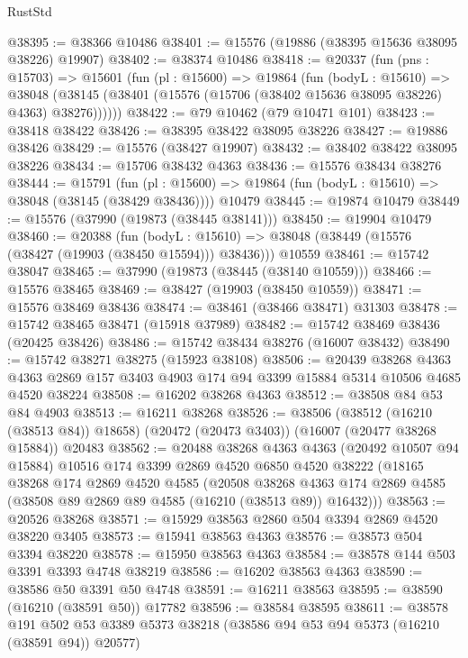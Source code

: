 \begin{lexlean}{RustStd}
\begin{coremodule}
@38395 := @38366 @10486
@38401 := @15576 (@19886 (@38395 @15636 @38095 @38226) @19907)
@38402 := @38374 @10486
@38418 := @20337
    (fun (pns : @15703) =>
    @15601
      (fun (pl : @15600) =>
      @19864
        (fun (bodyL : @15610) =>
        @38048 (@38145 (@38401 (@15576 (@15706 (@38402 @15636 @38095 @38226) @4363) @38276))))))
@38422 := @79 @10462 (@79 @10471 @101)
@38423 := @38418 @38422
@38426 := @38395 @38422 @38095 @38226
@38427 := @19886 @38426
@38429 := @15576 (@38427 @19907)
@38432 := @38402 @38422 @38095 @38226
@38434 := @15706 @38432 @4363
@38436 := @15576 @38434 @38276
@38444 := @15791
    (fun (pl : @15600) => @19864 (fun (bodyL : @15610) => @38048 (@38145 (@38429 @38436))))
    @10479
@38445 := @19874 @10479
@38449 := @15576 (@37990 (@19873 (@38445 @38141)))
@38450 := @19904 @10479
@38460 := @20388
    (fun (bodyL : @15610) => @38048 (@38449 (@15576 (@38427 (@19903 (@38450 @15594))) @38436)))
    @10559
@38461 := @15742 @38047
@38465 := @37990 (@19873 (@38445 (@38140 @10559)))
@38466 := @15576 @38465
@38469 := @38427 (@19903 (@38450 @10559))
@38471 := @15576 @38469 @38436
@38474 := @38461 (@38466 @38471) @31303
@38478 := @15742 @38465 @38471 (@15918 @37989)
@38482 := @15742 @38469 @38436 (@20425 @38426)
@38486 := @15742 @38434 @38276 (@16007 @38432)
@38490 := @15742 @38271 @38275 (@15923 @38108)
@38506 := @20439
    @38268
    @4363
    @4363
    @2869
    @157
    @3403
    @4903
    @174
    @94
    @3399
    @15884
    @5314
    @10506
    @4685
    @4520
    @38224
@38508 := @16202 @38268 @4363
@38512 := @38508 @84 @53 @84 @4903
@38513 := @16211 @38268
@38526 := @38506
    (@38512 (@16210 (@38513 @84)) @18658)
    (@20472 (@20473 @3403))
    (@16007 (@20477 @38268 @15884))
    @20483
@38562 := @20488
    @38268
    @4363
    @4363
    (@20492 @10507 @94 @15884)
    @10516
    @174
    @3399
    @2869
    @4520
    @6850
    @4520
    @38222
    (@18165
      @38268
      @174
      @2869
      @4520
      @4585
      (@20508
        @38268
        @4363
        @174
        @2869
        @4585
        (@38508 @89 @2869 @89 @4585 (@16210 (@38513 @89)) @16432)))
@38563 := @20526 @38268
@38571 := @15929 @38563 @2860 @504 @3394 @2869 @4520 @38220 @3405
@38573 := @15941 @38563 @4363
@38576 := @38573 @504 @3394 @38220
@38578 := @15950 @38563 @4363
@38584 := @38578 @144 @503 @3391 @3393 @4748 @38219
@38586 := @16202 @38563 @4363
@38590 := @38586 @50 @3391 @50 @4748
@38591 := @16211 @38563
@38595 := @38590 (@16210 (@38591 @50)) @17782
@38596 := @38584 @38595
@38611 := @38578
    @191
    @502
    @53
    @3389
    @5373
    @38218
    (@38586 @94 @53 @94 @5373 (@16210 (@38591 @94)) @20577)

\end{coremodule}
\end{lexlean}
